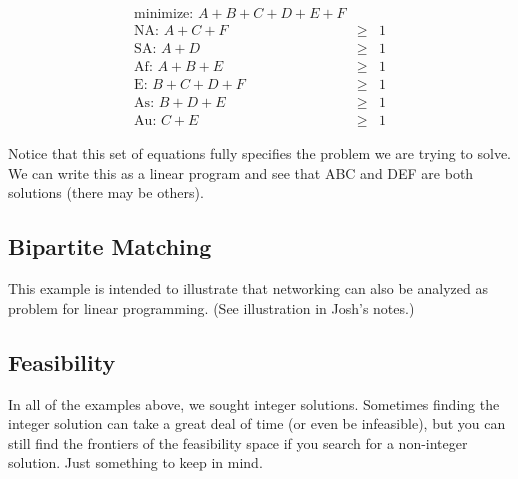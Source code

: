 \documentclass[12pt,letter]{article}
\begin{document}
\begin{eqnarray} %
\label{airlineeqn}
\text{minimize:  } A+B+C+D+E+F \\
\text{NA:  } A + C + F  &\geq& 1 \\
\text{SA:  } A + D  &\geq& 1 \\
\text{Af:  } A + B + E  &\geq& 1 \\ 
\text{E:  } B + C + D + F &\geq& 1 \\ 
\text{As:  } B + D + E  &\geq& 1 \\
\text{Au:  } C + E  &\geq& 1 
\end{eqnarray}

Notice that this set of equations fully specifies the
problem we are trying to solve. We can write this as a linear
program and see that ABC and DEF are both solutions (there may be
others).

\subsection{Bipartite Matching}
This example is intended to illustrate that networking can also be
analyzed as problem for linear programming. (See illustration in
Josh's notes.) %

\subsection{Feasibility}

In all of the examples above, we sought integer solutions. Sometimes
finding the integer solution can take a great deal of time (or even be
infeasible), but you can still find the frontiers of the feasibility
space if you search for a non-integer solution. Just something to keep
in mind. 
 

\pagebreak
\onehalfspacing



\pagebreak
\end{document}
